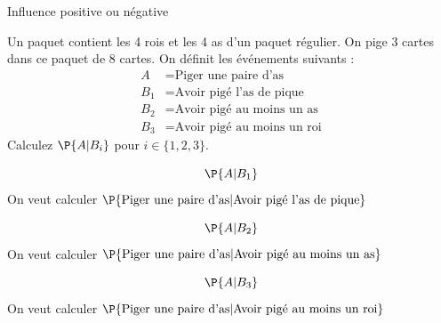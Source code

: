 \documentclass[nuit,charter,pied]{BeamerJS}
\begin{document}
\begin{frame}[t]{Influence positive ou négative}
\pause
\begin{ex}
    Un paquet contient les 4 rois et les 4 as d'un paquet régulier. On pige 3 cartes dans ce paquet de 8 cartes. On définit les événements suivants :
    \begin{align*}
    	A&=\text{Piger une paire d'as}\\
    	B_1&=\text{Avoir pigé l'as de pique}\\
    	B_2&=\text{Avoir pigé au moins un as}\\
    	B_3&=\text{Avoir pigé au moins un roi}
    \end{align*}
    \pause
Calculez $\P{A|B_i}$ pour $i\in\{1,2,3\}$.
\end{ex}
\end{frame}

\begin{frame}{}
	\begin{cadre}
	\[\P{A|B_1}\]
	On veut calculer $\P{\text{Piger une paire d'as}|\text{Avoir pigé l'as de pique}}$
	\end{cadre}
\end{frame}
\begin{frame}{}
	\begin{cadre}
		\[\P{A|B_2}\]
		On veut calculer $\P{\text{Piger une paire d'as}|\text{Avoir pigé au moins un as}}$
	\end{cadre}
\end{frame}
\begin{frame}{}
	\begin{cadre}
		\[\P{A|B_3}\]
		On veut calculer $\P{\text{Piger une paire d'as}|\text{Avoir pigé au moins un roi}}$
	\end{cadre}
\end{frame}
\end{document}

